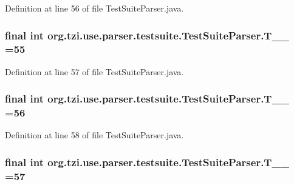 Definition at line 56 of file Test\-Suite\-Parser.\-java.

\hypertarget{classorg_1_1tzi_1_1use_1_1parser_1_1testsuite_1_1_test_suite_parser_a76fc2a8a209747ff65c7ab3eda31cffc}{
\subsubsection[{T\-\_\-\-\_\-55}]{\setlength{\rightskip}{0pt plus 5cm}final int org.\-tzi.\-use.\-parser.\-testsuite.\-Test\-Suite\-Parser.\-T\-\_\-\-\_ =55\hspace{0.3cm}{\ttfamily [static]}}}\label{classorg_1_1tzi_1_1use_1_1parser_1_1testsuite_1_1_test_suite_parser_a76fc2a8a209747ff65c7ab3eda31cffc}


Definition at line 57 of file Test\-Suite\-Parser.\-java.

\hypertarget{classorg_1_1tzi_1_1use_1_1parser_1_1testsuite_1_1_test_suite_parser_a0327a26bbec1b754a4a4b866e938464e}{
\subsubsection[{T\-\_\-\-\_\-56}]{\setlength{\rightskip}{0pt plus 5cm}final int org.\-tzi.\-use.\-parser.\-testsuite.\-Test\-Suite\-Parser.\-T\-\_\-\-\_ =56\hspace{0.3cm}{\ttfamily [static]}}}\label{classorg_1_1tzi_1_1use_1_1parser_1_1testsuite_1_1_test_suite_parser_a0327a26bbec1b754a4a4b866e938464e}


Definition at line 58 of file Test\-Suite\-Parser.\-java.

\hypertarget{classorg_1_1tzi_1_1use_1_1parser_1_1testsuite_1_1_test_suite_parser_ac95fb75f4b5bb5c700c1b76fdeb59474}{
\subsubsection[{T\-\_\-\-\_\-57}]{\setlength{\rightskip}{0pt plus 5cm}final int org.\-tzi.\-use.\-parser.\-testsuite.\-Test\-Suite\-Parser.\-T\-\_\-\-\_ =57\hspace{0.3cm}{\ttfamily [static]}}}\label{classorg_1_1tzi_1_1use_1_1parser_1_1testsuite_1_1_test_suite_parser_ac95fb75f4b5bb5c700c1b76fdeb59474}


